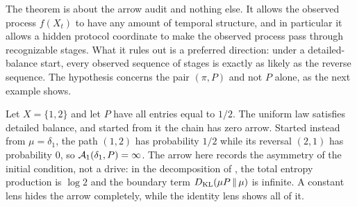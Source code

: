 \begin{remark}\label{rem:protocol_trap_reading}
The theorem is about the arrow audit and nothing else.
It allows the observed process $f(X_t)$ to have any amount of temporal structure, and in particular it allows a hidden protocol coordinate to make the observed process pass through recognizable stages.
What it rules out is a preferred direction: under a detailed-balance start, every observed sequence of stages is exactly as likely as the reverse sequence.
The hypothesis concerns the pair $(\pi,P)$ and not $P$ alone, as the next example shows.
\end{remark}

\begin{example}\label{ex:transient_arrow}
Let $X=\{1,2\}$ and let $P$ have all entries equal to $1/2$.
The uniform law satisfies detailed balance, and started from it the chain has zero arrow.
Started instead from $\mu=\delta_1$, the path $(1,2)$ has probability $1/2$ while its reversal $(2,1)$ has probability $0$, so $\mathcal{A}_1(\delta_1,P)=\infty$.
The arrow here records the asymmetry of the initial condition, not a drive: in the decomposition of , the total entropy production is $\log 2$ and the boundary term $D_{\mathrm{KL}}\!\left(\mu P\,\middle\|\,\mu\right)$ is infinite.
A constant lens hides the arrow completely, while the identity lens shows all of it.
\end{example}

